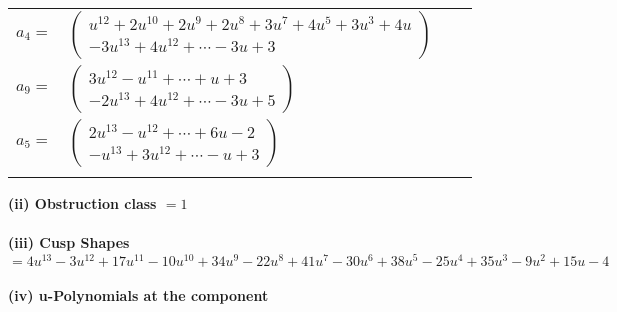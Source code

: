 \documentclass[1p]{elsarticle_modified}
\theoremstyle{definition}
\begin{document}
\begin{tabular}{m{7pt} m{180pt} m{7pt} m{180pt} }
\flushright $a_{4}=$&$\begin{pmatrix}u^{12}+2 u^{10}+2 u^9+2 u^8+3 u^7+4 u^5+3 u^3+4 u\\-3 u^{13}+4 u^{12}+\cdots-3 u+3\end{pmatrix}$ \\
\flushright $a_{9}=$&$\begin{pmatrix}3 u^{12}- u^{11}+\cdots+u+3\\-2 u^{13}+4 u^{12}+\cdots-3 u+5\end{pmatrix}$ \\
\flushright $a_{5}=$&$\begin{pmatrix}2 u^{13}- u^{12}+\cdots+6 u-2\\- u^{13}+3 u^{12}+\cdots- u+3\end{pmatrix}$\\&\end{tabular}
\flushleft \textbf{(ii) Obstruction class $= 1$}\\~\\
\flushleft \textbf{(iii) Cusp Shapes $= 4 u^{13}-3 u^{12}+17 u^{11}-10 u^{10}+34 u^9-22 u^8+41 u^7-30 u^6+38 u^5-25 u^4+35 u^3-9 u^2+15 u-4$}\\~\\
\newpage\renewcommand{\arraystretch}{1}
\flushleft \textbf{(iv) u-Polynomials at the component}\newline \\
\end{document}
